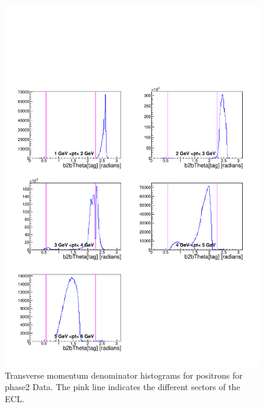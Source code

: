 \documentclass[a4paper,11pt,twosided,final,german,openbib,pdftex,listof=totoc,bibliography=totoc]{scrbook}
\begin{document}
\begin{appendix}
\begin{figure}[!htbp]
	\centering
	\includegraphics[width=\textwidth]{Plots/master/xPtMThetaepD_Data}
	\caption[Transverse Momentum $\phi$ Positron Denominator Histogram Phase2 Data]{Transverse momentum denominator histograms for positrons for phase2 Data. The pink line indicates the different sectors of the ECL.}
	\label{plt:PtMThetaepD_Data}
\end{figure}





\listoffigures
\listoftables

\nocite{*}
\printbibliography[title={Bibliography}]




\end{appendix}
\end{document}
